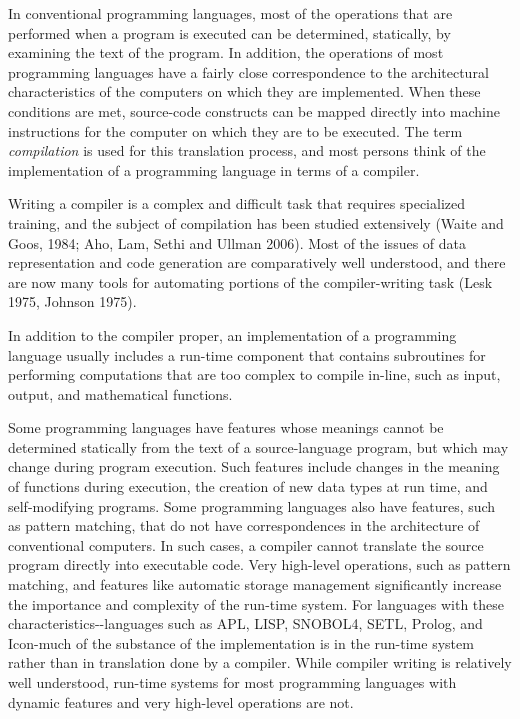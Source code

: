 In conventional programming languages, most of the operations that are
performed when a program is executed can be determined, statically, by
examining the text of the program. In addition, the operations of most
programming languages have a fairly close correspondence to the
architectural characteristics of the computers on which they are
implemented.  When these conditions are met, source-code constructs
can be mapped directly into machine instructions for the computer on
which they are to be executed. The term \textit{compilation} is used
for this translation process, and most persons think of the
implementation of a programming language in terms of a compiler.

Writing a compiler is a complex and difficult task that requires
specialized training, and the subject of compilation has been studied
extensively (Waite and Goos, 1984; Aho, Lam, Sethi and Ullman
2006). Most of the issues of data representation and code generation
are comparatively well understood, and there are now many tools for
automating portions of the compiler-writing task (Lesk 1975, Johnson
1975).


In addition to the compiler proper, an implementation of a programming
language usually includes a run-time component that contains
subroutines for performing computations that are too complex to
compile in-line, such as input, output, and mathematical functions.


Some programming languages have features whose meanings cannot be
determined statically from the text of a source-language program, but
which may change during program execution. Such features include
changes in the meaning of functions during execution, the creation of
new data types at run time, and self-modifying programs. Some
programming languages also have features, such as pattern matching,
that do not have correspondences in the architecture of conventional
computers. In such cases, a compiler cannot translate the source
program directly into executable code.  Very high-level operations,
such as pattern matching, and features like automatic storage
management significantly increase the importance and complexity of the
run-time system. For languages with these characteristics-{}-languages
such as APL, LISP, SNOBOL4, SETL, Prolog, and Icon-much of the
substance of the implementation is in the run-time system rather than
in translation done by a compiler. While compiler writing is
relatively well understood, run-time systems for most programming
languages with dynamic features and very high-level operations are
not.


